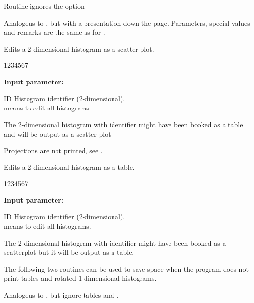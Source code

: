 Routine  ignores the option
 
 
\Action
Analogous to , but with a presentation down the page.
Parameters, special values and remarks are the same as for .
 
 
\Action
Edits a 2-dimensional histogram as a scatter-plot.
 
\begin{DLttc}{1234567}
\item[{\rm\bf Input parameter:}]
\item[ID] Histogram identifier (2-dimensional).     \\
 means to edit all histograms.
\end{DLttc}
 
\Remark
 
\begin{UL}
\item The 2-dimensional histogram with identifier 
might have been booked as a table and will be output
as a scatter-plot
\item Projections are not printed, see .
\end{UL}
 
 
\Action
Edits a 2-dimensional histogram as a table.
 
\begin{DLttc}{1234567}
\item[{\rm\bf Input parameter:}]
\item[ID] Histogram identifier (2-dimensional).     \\
 means to edit all histograms.
\end{DLttc}
 
\Remark
 
\begin{UL}
\item The 2-dimensional histogram with identifier 
might have been booked as a scatterplot but it
will be output as a table.
\end{UL}
 
The following two routines can be used to save space when the program
does not print tables and rotated 1-dimensional histograms.
 
 
\Action
Analogous to
, but ignore tables and .
 
